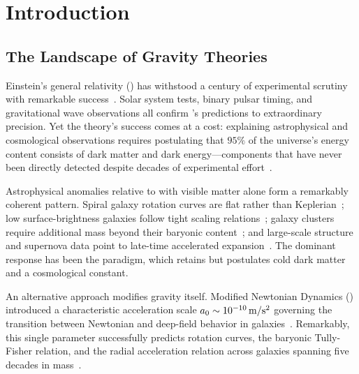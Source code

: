 
\section{Introduction}\label{sec:introduction}

\subsection{The Landscape of Gravity Theories}\label{sec:landscape}

Einstein's general relativity (\GR) has withstood a century of experimental 
scrutiny with remarkable success~\cite{Will2014LRR,Will2018}. Solar system tests, 
binary pulsar timing, and gravitational wave observations all confirm \GR's 
predictions to extraordinary precision. Yet the theory's success comes at a 
cost: explaining astrophysical and cosmological observations requires postulating 
that $95\%$ of the universe's energy content consists of dark matter and dark 
energy---components that have never been directly detected despite decades of 
experimental effort~\cite{Bertone2018,Peebles2003}.

Astrophysical anomalies relative to \GR with visible matter alone form a 
remarkably coherent pattern. Spiral galaxy rotation curves are flat rather than 
Keplerian~\cite{Rubin1980}; low surface-brightness galaxies follow tight scaling 
relations~\cite{McGaugh2016RAR}; galaxy clusters require additional mass beyond 
their baryonic content~\cite{Zwicky1933}; and large-scale structure and supernova 
data point to late-time accelerated expansion~\cite{Riess1998,Perlmutter1999}. 
The dominant response has been the \LCDM paradigm, which retains \GR but 
postulates cold dark matter and a cosmological constant.

An alternative approach modifies gravity itself. Modified Newtonian Dynamics 
(\MOND) introduced a characteristic acceleration scale 
$\azero \sim 10^{-10}\,\si{m/s^2}$ governing the transition between Newtonian 
and deep-field behavior in galaxies~\cite{Milgrom1983,FamaeyMcGaugh2012}. 
Remarkably, this single parameter successfully predicts rotation curves, the 
baryonic Tully-Fisher relation, and the radial acceleration relation across 
galaxies spanning five decades in mass~\cite{Lelli2017}.

